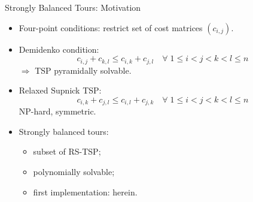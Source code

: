 \documentclass[
  size=8pt,
  style=klope,
  paper=screen,
  pauseslide,
  nopagebreaks,
  hlsections,
  fleqn
]{powerdot}
\begin{document}
\begin{slide}[toc=Strongly Balanced Tours]{Strongly Balanced Tours: Motivation}
  \begin{itemize}
  \item
  Four-point conditions: restrict set of cost matrices $\left(c_{i,j}\right)$.
  \item
    Demidenko condition:
    \begin{equation}
      c_{i,j} + c_{k,l} \leq c_{i,k} + c_{j,l} \quad
      \forall \; 1 \leq i < j < k < l \leq n
    \end{equation}
    $\Rightarrow$
    TSP pyramidally solvable.
  \item
    Relaxed Supnick TSP:
    \begin{equation}
      c_{i,k} + c_{j,l} \leq c_{i,l} + c_{j,k} \quad
      \forall \; 1 \leq i < j < k < l \leq n
    \end{equation}
    NP-hard, symmetric.
    \item
    Strongly balanced tours:
    \begin{itemize}
      \item subset of RS-TSP;
      \item polynomially solvable;
      \item first implementation: herein.
    \end{itemize}
  \end{itemize}
\end{slide}
\end{document}
